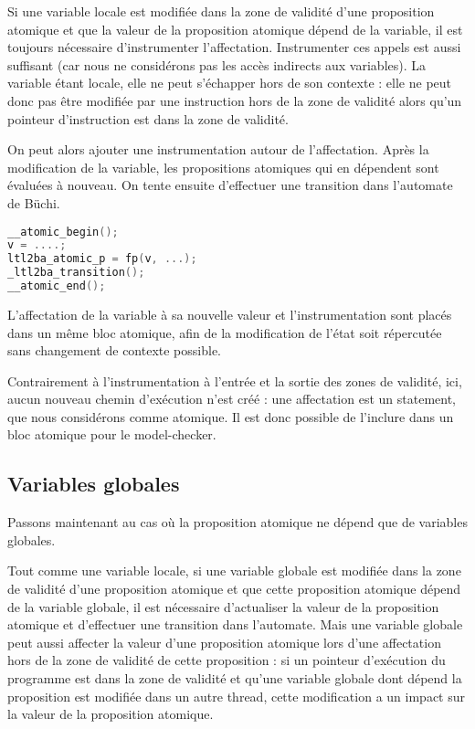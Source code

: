 Si une variable locale est modifiée dans la zone de validité d'une
proposition atomique et que la valeur de la proposition atomique dépend
de la variable, il est toujours nécessaire d'instrumenter l'affectation.
Instrumenter ces appels est aussi suffisant (car nous ne considérons pas
les accès indirects aux variables). La variable étant locale, elle ne
peut s'échapper hors de son contexte : elle ne peut donc pas être
modifiée par une instruction hors de la zone de validité alors qu'un
pointeur d'instruction est dans la zone de validité.

On peut alors ajouter une instrumentation autour de l'affectation. Après
la modification de la variable, les propositions atomiques qui en
dépendent sont évaluées à nouveau. On tente ensuite d'effectuer une
transition dans l'automate de Büchi.

\begin{lstlisting}[language=C, frame=single, caption=Instrumentation pour une
  variable locale]
__atomic_begin();
v = ....;
ltl2ba_atomic_p = fp(v, ...);
_ltl2ba_transition();
__atomic_end();
\end{lstlisting}

L'affectation de la variable à sa nouvelle valeur et l'instrumentation
sont placés dans un même bloc atomique, afin de la modification de
l'état soit répercutée sans changement de contexte possible.

Contrairement à l'instrumentation à l'entrée et la sortie des zones de
validité, ici, aucun nouveau chemin d'exécution n'est créé : une
affectation est un statement, que nous considérons comme atomique. Il
est donc possible de l'inclure dans un bloc atomique pour le
model-checker.

\subsection{Variables globales}

Passons maintenant au cas où la proposition atomique ne dépend que de
variables globales.

Tout comme une variable locale, si une variable globale est modifiée
dans la zone de validité d'une proposition atomique et que cette
proposition atomique dépend de la variable globale, il est nécessaire
d'actualiser la valeur de la proposition atomique et d'effectuer une
transition dans l'automate. Mais une variable globale peut aussi
affecter la valeur d'une proposition atomique lors d'une affectation
hors de la zone de validité de cette proposition : si un pointeur
d'exécution du programme est dans la zone de validité et qu'une variable
globale dont dépend la proposition est modifiée dans un autre thread,
cette modification a un impact sur la valeur de la proposition atomique.

